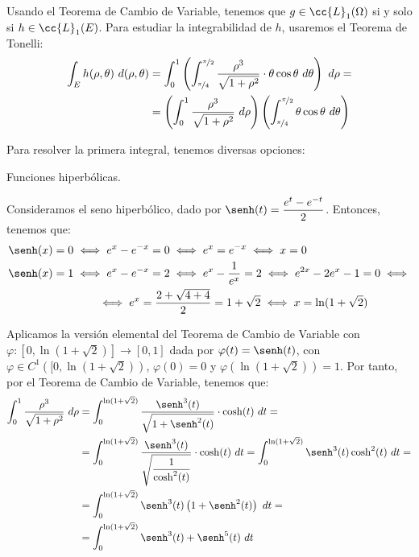 \begin{ejercicio}
    Usando el Teorema de Cambio de Variable, tenemos que $g\in \cc{L}_1(\Omega)$ si y solo si $h\in \cc{L}_1(E)$. Para estudiar la integrabilidad de $h$, usaremos el Teorema de Tonelli:
    \begin{align*}
        \int_E h(\rho, \theta)~d(\rho, \theta) &=
        \int_0^1 \left( \int_{\nicefrac{\pi}{4}}^{\nicefrac{\pi}{2}} \dfrac{\rho^3}{\sqrt{1+\rho^2}}\cdot \theta\cos\theta~d\theta \right)~d\rho =\\
        &= \left( \int_0^1 \dfrac{\rho^3}{\sqrt{1+\rho^2}} ~d\rho \right) \left( \int_{\nicefrac{\pi}{4}}^{\nicefrac{\pi}{2}} \theta\cos\theta~d\theta \right)
    \end{align*}

    Para resolver la primera integral, tenemos diversas opciones:
    \begin{description}\label{desc:optInt}
        \item[Opción 1.] Funciones hiperbólicas.
        
        Consideramos el seno hiperbólico, dado por $\senh(t)=\dfrac{e^t-e^{-t}}{2}$. Entonces, tenemos que:
        \begin{align*}
            \senh(x)=0 &\iff e^x-e^{-x}=0 \iff e^x = e^{-x} \iff x=0\\
            \senh(x)=1 &\iff e^x-e^{-x}=2 \iff e^x -\dfrac{1}{e^x}=2 \iff e^{2x}-2e^x-1=0 \iff \\&\qquad \iff e^x = \dfrac{2+\sqrt{4+4}}{2} = 1+\sqrt{2} \iff x = \ln(1+\sqrt{2})
        \end{align*}
        
        Aplicamos la versión elemental del Teorema de Cambio de Variable con $\varphi:\left[0,\ln(1+\sqrt{2})\right]\to [0,1]$ dada por $\varphi(t)=\senh(t)$, con $\varphi\in C^1\left([0,\ln(1+\sqrt{2})\right)$, $\varphi(0)=0$ y $\varphi\left(\ln(1+\sqrt{2})\right)=1$. Por tanto, por el Teorema de Cambio de Variable, tenemos que:
        \begin{align*}
            \int_0^1 \dfrac{\rho^3}{\sqrt{1+\rho^2}} ~d\rho &= \int_0^{\ln(1+\sqrt{2})} \dfrac{\senh^3(t)}{\sqrt{1+\senh^2(t)}}\cdot \cosh(t)~dt =\\
            &= \int_0^{\ln(1+\sqrt{2})} \dfrac{\senh^3(t)}{\sqrt{\dfrac{1}{\cosh^2(t)}}}\cdot \cosh(t)~dt
            = \int_0^{\ln(1+\sqrt{2})} \senh^3(t)\cosh^2(t)~dt =\\
            &= \int_0^{\ln(1+\sqrt{2})} \senh^3(t)\left(1+\senh^2(t)\right)~dt =\\
            &= \int_0^{\ln(1+\sqrt{2})} \senh^3(t) + \senh^5(t)~dt
        \end{align*}


\end{description}
\end{ejercicio}
